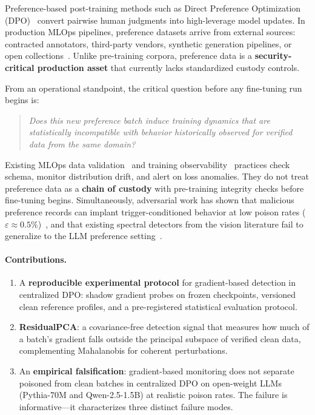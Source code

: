 \documentclass[runningheads]{llncs}
\begin{document}
Preference-based post-training methods such as Direct Preference Optimization
(DPO)~\cite{rafailov2023dpo} convert pairwise human judgments into
high-leverage model updates. In production MLOps pipelines, preference datasets
arrive from external sources: contracted annotators, third-party vendors,
synthetic generation pipelines, or open collections~\cite{polyzotis2019data}.
Unlike pre-training corpora, preference data is a \textbf{security-critical
production asset} that currently lacks standardized custody controls.

From an operational standpoint, the critical question before any fine-tuning
run begins is:

\begin{quote}
\textit{Does this new preference batch induce training dynamics that are
statistically incompatible with behavior historically observed for verified
data from the same domain?}
\end{quote}

Existing MLOps data validation~\cite{polyzotis2019data} and training
observability~\cite{rauschmayr2021sagemaker} practices check schema, monitor
distribution drift, and alert on loss anomalies. They do not treat preference
data as a \textbf{chain of custody} with pre-training integrity checks before
fine-tuning
begins. Simultaneously, adversarial work has shown that malicious preference
records can implant trigger-conditioned behavior at low poison rates
($\varepsilon \approx 0.5\%$)~\cite{pathmanathan2024poisoning,rando2023jailbreak,baumgartner2024bestofvenom},
and that existing spectral detectors from the vision literature fail to
generalize to the LLM preference setting~\cite{pathmanathan2024poisoning}.

\paragraph{Contributions.}
\begin{enumerate}[leftmargin=*,noitemsep]
  \item A \textbf{reproducible experimental protocol} for gradient-based
    detection in centralized DPO: shadow gradient probes on frozen
    checkpoints, versioned clean reference profiles, and a pre-registered
    statistical evaluation protocol.
  \item \textbf{ResidualPCA}: a covariance-free detection signal that measures
    how much of a batch's gradient falls outside the principal subspace of
    verified clean data, complementing Mahalanobis for coherent perturbations.
  \item An \textbf{empirical falsification}: gradient-based monitoring does not
    separate poisoned from clean batches in centralized DPO on open-weight
    LLMs (Pythia-70M and Qwen-2.5-1.5B) at realistic poison rates. The failure
    is informative---it characterizes three distinct failure modes.
\end{enumerate}
\end{document}

